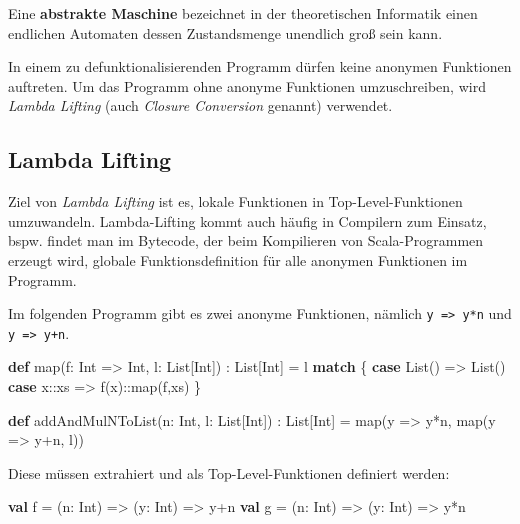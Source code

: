 \documentclass[]{article}
\newenvironment{Shaded}{}{}
\newcommand{\FunctionTok}[1]{\textcolor[rgb]{0.02,0.16,0.49}{#1}}
\newcommand{\KeywordTok}[1]{\textcolor[rgb]{0.00,0.44,0.13}{\textbf{#1}}}
\newcommand{\NormalTok}[1]{#1}
\begin{document}
Eine \textbf{abstrakte Maschine} bezeichnet in der theoretischen
Informatik einen endlichen Automaten dessen Zustandsmenge unendlich groß
sein kann.

In einem zu defunktionalisierenden Programm dürfen keine anonymen
Funktionen auftreten. Um das Programm ohne anonyme Funktionen
umzuschreiben, wird \emph{Lambda Lifting} (auch \emph{Closure
Conversion} genannt) verwendet.

\hypertarget{lambda-lifting}{%
\subsection{Lambda Lifting}\label{lambda-lifting}}

Ziel von \emph{Lambda Lifting} ist es, lokale Funktionen in
Top-Level-Funktionen umzuwandeln. Lambda-Lifting kommt auch häufig in
Compilern zum Einsatz, bspw. findet man im Bytecode, der beim
Kompilieren von Scala-Programmen erzeugt wird, globale
Funktionsdefinition für alle anonymen Funktionen im Programm.

Im folgenden Programm gibt es zwei anonyme Funktionen, nämlich
\texttt{y\ =\textgreater{}\ y*n} und \texttt{y\ =\textgreater{}\ y+n}.

\begin{Shaded}
\begin{Highlighting}[]
\KeywordTok{def} \FunctionTok{map}\NormalTok{(f: Int =\textgreater{} Int, l: List[Int]) : List[Int] = l }\KeywordTok{match}\NormalTok{ \{}
  \KeywordTok{case}\NormalTok{ List() =\textgreater{} List()}
  \KeywordTok{case}\NormalTok{ x::xs =\textgreater{} }\FunctionTok{f}\NormalTok{(x)::}\FunctionTok{map}\NormalTok{(f,xs)}
\NormalTok{\}}

\KeywordTok{def} \FunctionTok{addAndMulNToList}\NormalTok{(n: Int, l: List[Int]) : List[Int] = }
  \FunctionTok{map}\NormalTok{(y =\textgreater{} y*n, }\FunctionTok{map}\NormalTok{(y =\textgreater{} y+n, l))}
\end{Highlighting}
\end{Shaded}

Diese müssen extrahiert und als Top-Level-Funktionen definiert werden:

\begin{Shaded}
\begin{Highlighting}[]
\KeywordTok{val}\NormalTok{ f = (n: Int) =\textgreater{} (y: Int) =\textgreater{} y+n}
\KeywordTok{val}\NormalTok{ g = (n: Int) =\textgreater{} (y: Int) =\textgreater{} y*n}
\end{Highlighting}
\end{Shaded}
\end{document}
